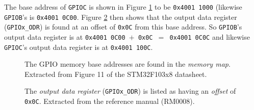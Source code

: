 \documentclass{UoNMCHA}
\numberwithin{equation}{section}
\begin{document}
The base address of \texttt{GPIOC} is shown in Figure \ref{fig:gpioaddr} to be \texttt{0x4001 1000} (likewise \texttt{GPIOB}'s is \texttt{0x4001 0C00}. Figure \ref{fig:gpioodr} then shows that the output data register (\texttt{GPIOx\_ODR}) is found at an offset of \texttt{0x0C} from this base address. So \texttt{GPIOB}'s output data register is at \texttt{0x4001 0C00 $+$ 0x0C $=$ 0x4001 0C0C} and likewise \texttt{GPIOC}'s output data register is at \texttt{0x4001 100C}.



\begin{figure}[H]
\caption{The GPIO memory base addresses are found in the \textit{memory map}. Extracted from Figure 11 of the STM32F103x8 datasheet.}
\label{fig:gpioaddr}
\end{figure}

\begin{figure}[H]
\caption{The \textit{output data register} (\texttt{GPIOx\_ODR}) is listed as having an \textit{offset} of \texttt{0x0C}. Extracted from the reference manual (RM0008).}
\label{fig:gpioodr}
\end{figure}
\end{document}
